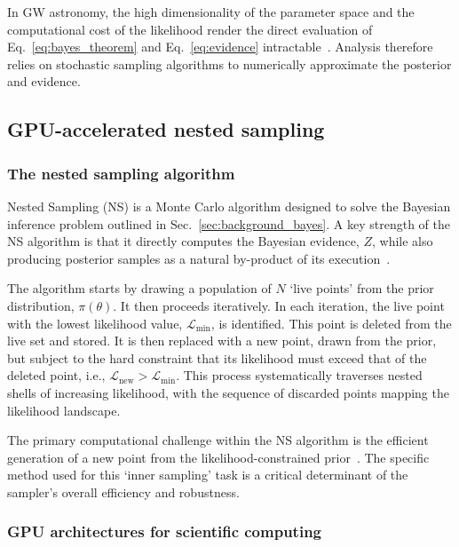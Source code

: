 \documentclass[fleqn,usenatbib]{mnras}
\begin{document}
In GW astronomy, the high dimensionality of the parameter space and
the computational cost of the likelihood render the direct evaluation
of Eq.~\ref{eq:bayes_theorem} and Eq.~\ref{eq:evidence} intractable~\citep{LIGO_guide_signalextraction}.
Analysis therefore relies on stochastic sampling algorithms to
numerically approximate the posterior and evidence.

\subsection{GPU-accelerated nested sampling}

\label{sec:background_ns_and_gpus}

\subsubsection{The nested sampling algorithm}
\label{sec:background_ns}

Nested Sampling (NS) is a Monte Carlo algorithm designed to solve the
Bayesian inference problem outlined in Sec.~\ref{sec:background_bayes}.
A key strength of the NS algorithm is that it directly computes the
Bayesian evidence, $Z$, while also producing posterior samples as a
natural by-product of its execution~\citep{skilling}.

The algorithm starts by drawing a population of $N$ `live points'
from the prior distribution, $\pi(\theta)$. It then proceeds
iteratively. In each iteration, the live point with the lowest
likelihood value, $\mathcal{L}_{\text{min}}$, is identified. This point
is deleted from the live set and stored. It is then replaced with a
new point, drawn from the prior, but subject to the hard constraint that
its likelihood must exceed that of the deleted point,
i.e., $\mathcal{L}_{\text{new}} > \mathcal{L}_{\text{min}}$. This process
systematically traverses nested shells of increasing likelihood, with
the sequence of discarded points mapping the likelihood landscape.

The primary computational challenge within the NS algorithm is the
efficient generation of a new point from the likelihood-constrained
prior~\citep{NSNature}. The specific method used for this `inner sampling' task is a
critical determinant of the sampler's overall efficiency and robustness.

\subsubsection{GPU architectures for scientific computing}
\label{sec:background_gpus}
\end{document}
